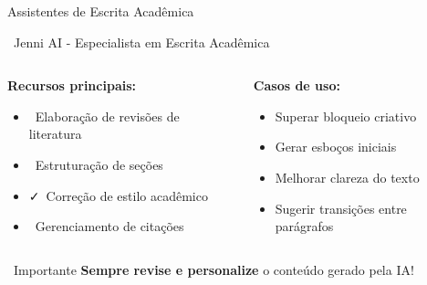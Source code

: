 \documentclass[aspectratio=169,12pt]{beamer}
\begin{document}
\begin{frame}{Assistentes de Escrita Acadêmica}
    \begin{block}{\faPen\, Jenni AI - Especialista em Escrita Acadêmica}
        \begin{columns}
            \begin{column}{0.5\textwidth}
                \textbf{Recursos principais:}
                \begin{itemize}
                    \item \faEdit\, Elaboração de revisões de literatura
                    \item \faList\, Estruturação de seções
                    \item \faCheck\, Correção de estilo acadêmico
                    \item \faQuoteLeft\, Gerenciamento de citações
                \end{itemize}
            \end{column}
            \begin{column}{0.5\textwidth}
                \textbf{Casos de uso:}
                \begin{itemize}
                    \item Superar bloqueio criativo
                    \item Gerar esboços iniciais
                    \item Melhorar clareza do texto
                    \item Sugerir transições entre parágrafos
                \end{itemize}
            \end{column}
        \end{columns}
    \end{block}
    
    \begin{alertblock}{\faExclamationTriangle\, Importante}
        \textbf{Sempre revise e personalize} o conteúdo gerado pela IA!
    \end{alertblock}
\end{frame}
\end{document}
